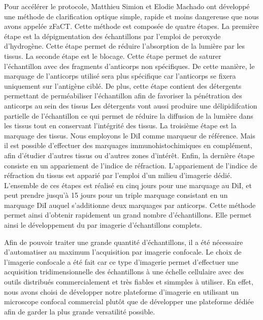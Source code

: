 \documentclass[\main/main.tex]{subfiles}
\begin{document}
%
Pour accélérer le protocole, Matthieu Simion et Elodie Machado ont développé une méthode de clarification optique simple, rapide et moins dangereuse que nous avons appelée zFaCT.
%
Cette méthode est composée de quatre étapes.
%
La première étape est la dépigmentation des échantillons
par l'emploi de peroxyde d'hydrogène.
%
Cette étape permet de réduire l'absorption de la lumière par les tissus.
%
La seconde étape est le blocage.
%
Cette étape permet de saturer l'échantillon avec des fragments d'anticorps non spécifiques.
%
De cette manière, le marquage de l'anticorps utilisé sera plus spécifique
 car l'anticorps se fixera uniquement sur l'antigène ciblé.
%
De plus, cette étape contient des détergents permettant de perméabiliser l'échantillon
afin de favoriser la pénétration des anticorps au sein des tissus
%
Les détergents vont aussi produire une délipidifcation partielle de l'échantillon
ce qui permet de réduire la diffusion de la lumière dans les tissus
tout en conservant l'intégrité des tissus.
%
La troisième étape est la marquage des tissus.
%
Nous employons le DiI comme marqueur de référence.
%
Mais il est possible d'effectuer des marquages immunohistochimiques en complément, afin d'étudier d'autres tissus ou d'autres zones d'intérêt.
%
Enfin, la dernière étape consiste en un appariement de l'indice de réfraction.
%
L'appariement de l'indice de réfraction du tissus est apparié
par l'emploi d'un milieu d'imagerie dédié.
%
L'ensemble de ces étapes est réalisé en cinq jours pour une marquage au DiI, et peut prendre jusqu'à 15 jours pour un triple marquage consistant en un marquage DiI auquel s'additionne deux marquages par anticorps.
%
Cette méthode permet ainsi d'obtenir rapidement un grand nombre d'échantillons.
%
Elle permet ainsi le développement du \hta par imagerie d'échantillons complets.

%
Afin de pouvoir traiter une grande quantité d'échantillons,
il a été nécessaire d'automatiser au maximum l'acquisition par imagerie confocale.
%
Le choix de l'imagerie confocale a été fait car ce type d'imagerie permet
d'effectuer une acquisition tridimensionnelle des échantillons à une échelle cellulaire avec des outils distribués commercialement et très fiables et simmples à utiliser.
%
En effet, nous avons choisi de développer notre plateforme d'imagerie
en utilisant un microscope confocal commercial plutôt que de développer une
plateforme dédiée afin de garder la plus grande versatilité possible.
\end{document}
